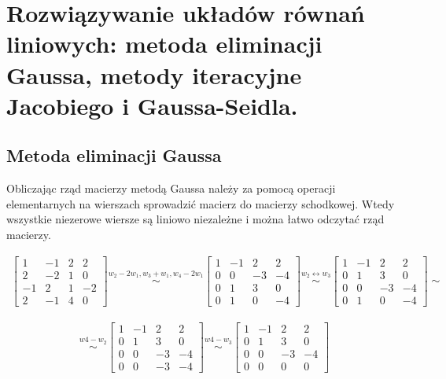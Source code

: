 \documentclass[12pt]{article}
\begin{document}
    \newpage

    \section{Rozwiązywanie układów równań liniowych: metoda eliminacji Gaussa, metody iteracyjne Jacobiego i Gaussa-Seidla.}

    \subsection{Metoda eliminacji Gaussa}

    Obliczając rząd macierzy metodą Gaussa należy za pomocą operacji elementarnych na wierszach sprowadzić macierz do
    macierzy schodkowej. Wtedy wszystkie niezerowe wiersze są liniowo niezależne i można łatwo odczytać rząd macierzy.

    \begin{align*}
        \begin{bmatrix}
            1 & -1 & 2 & 2\\
            2 & -2 & 1 & 0\\
            -1 & 2 & 1 & -2\\
            2 & -1 & 4 & 0
        \end{bmatrix}
        \stackrel{w_2 - 2w_1, w_3 + w_1, w_4 - 2w_1}{\sim}
        \begin{bmatrix}
            1 & -1 & 2 & 2\\
            0 & 0 & -3 & -4\\
            0 & 1 & 3 & 0\\
            0 & 1 & 0 & -4
        \end{bmatrix}
        \stackrel{w_2 \leftrightarrow w_3}{\sim}
        \begin{bmatrix}
            1 & -1 & 2 & 2\\
            0 & 1 & 3 & 0\\
            0 & 0 & -3 & -4\\
            0 & 1 & 0 & -4
        \end{bmatrix}
        \sim
    \end{align*}

    \begin{align*}
        \stackrel{w4 - w_2}{\sim}
        \begin{bmatrix}
            1 & -1 & 2 & 2\\
            0 & 1 & 3 & 0\\
            0 & 0 & -3 & -4\\
            0 & 0 & -3 & -4
        \end{bmatrix}
        \stackrel{w4 - w_3}{\sim}
        \begin{bmatrix}
            1 & -1 & 2 & 2\\
            0 & 1 & 3 & 0\\
            0 & 0 & -3 & -4\\
            0 & 0 & 0 & 0
        \end{bmatrix}
    \end{align*}
\end{document}
